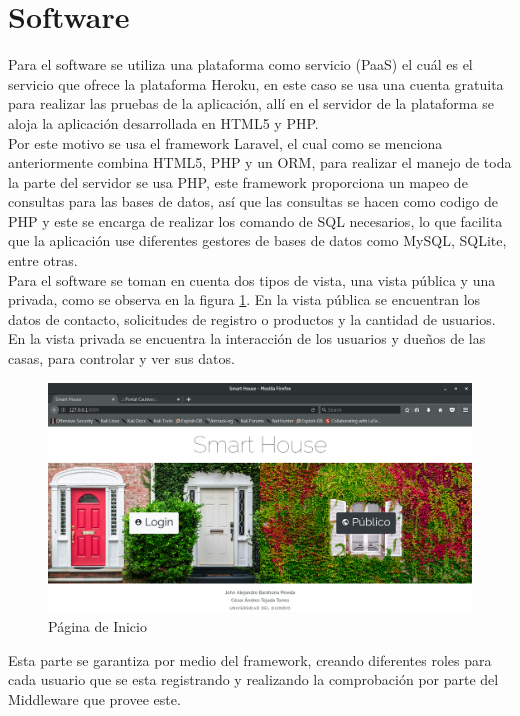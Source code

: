 \section{Software}

Para el software se utiliza una plataforma como servicio (PaaS) el cuál es el servicio que ofrece la plataforma Heroku, en este caso se usa una cuenta gratuita para realizar las pruebas de la aplicación, allí en el servidor de la plataforma se aloja la aplicación desarrollada en HTML5 y PHP.\\

Por este motivo se usa el framework Laravel, el cual como se menciona anteriormente combina HTML5, PHP y un ORM, para realizar el manejo de toda la parte del servidor se usa PHP, este framework proporciona un mapeo de consultas para las bases de datos, así que las consultas se hacen como codigo de PHP y este se encarga de realizar los comando de SQL necesarios, lo que facilita que la aplicación use diferentes gestores de bases de datos como MySQL, SQLite, entre otras.\\

Para el software se toman en cuenta dos tipos de vista, una vista pública y una privada, como se observa en la figura \ref{fig:index}. En la vista pública se encuentran los datos de contacto, solicitudes de registro o productos y la cantidad de usuarios. En la vista privada se encuentra la interacción de los usuarios y dueños de las casas, para controlar y ver sus datos.\\

\begin{figure}
	\centering
	\caption{Página de Inicio}
	\label{fig:index}
	\includegraphics[width=0.9\linewidth]{Imagenes/Index}
\end{figure}


Esta parte se garantiza por medio del framework, creando diferentes roles para cada usuario que se esta registrando y realizando la comprobación por parte del Middleware que provee este.\\

